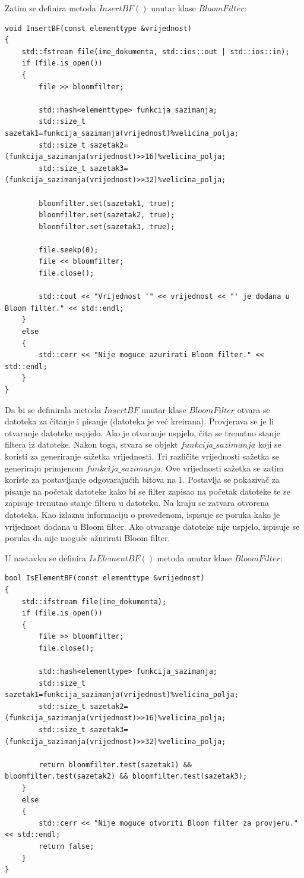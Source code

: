 \documentclass{foi}
\begin{document}
Zatim se definira metoda $InsertBF()$ unutar klase $BloomFilter$:

\begin{lstlisting}
void InsertBF(const elementtype &vrijednost)
{
    std::fstream file(ime_dokumenta, std::ios::out | std::ios::in);
    if (file.is_open())
    {
        file >> bloomfilter;

        std::hash<elementtype> funkcija_sazimanja;
        std::size_t sazetak1=funkcija_sazimanja(vrijednost)%velicina_polja;
        std::size_t sazetak2=(funkcija_sazimanja(vrijednost)>>16)%velicina_polja;
        std::size_t sazetak3=(funkcija_sazimanja(vrijednost)>>32)%velicina_polja;

        bloomfilter.set(sazetak1, true);
        bloomfilter.set(sazetak2, true);
        bloomfilter.set(sazetak3, true);

        file.seekp(0);
        file << bloomfilter;
        file.close();

        std::cout << "Vrijednost '" << vrijednost << "' je dodana u Bloom filter." << std::endl;
    }
    else
    {
        std::cerr << "Nije moguce azurirati Bloom filter." << std::endl;
    }
}
\end{lstlisting}

Da bi se definirala metoda $InsertBF$ unutar klase $BloomFilter$ otvara se datoteka za čitanje i pisanje (datoteka je već kreirana). Provjerava se je li otvaranje datoteke uspjelo. Ako je otvaranje uspjelo, čita se trenutno stanje filtera iz datoteke. Nakon toga, stvara se objekt $funkcija\_sazimanja$ koji se koristi za generiranje sažetka vrijednosti. Tri različite vrijednosti sažetka se generiraju primjenom $funkcija\_sazimanja$. Ove vrijednosti sažetka se zatim koriste za postavljanje odgovarajućih bitova na $1$. Postavlja se pokazivač za pisanje na početak datoteke kako bi se filter zapisao na početak datoteke te se zapisuje trenutno stanje filtera u datoteku. Na kraju se zatvara otvorena datoteka. Kao izlaznu informaciju o provedenom, ispisuje se poruka kako je vrijednost dodana u Bloom filter. Ako otvaranje datoteke nije uspjelo, ispisuje se poruka da nije moguće ažurirati Bloom filter.

U nastavku se definira $IsElementBF()$ metoda unutar klase $BloomFilter$:

\begin{lstlisting}
bool IsElementBF(const elementtype &vrijednost)
{
    std::ifstream file(ime_dokumenta);
    if (file.is_open())
    {
        file >> bloomfilter;
        file.close();

        std::hash<elementtype> funkcija_sazimanja;
        std::size_t sazetak1=funkcija_sazimanja(vrijednost)%velicina_polja;
        std::size_t sazetak2=(funkcija_sazimanja(vrijednost)>>16)%velicina_polja;
        std::size_t sazetak3=(funkcija_sazimanja(vrijednost)>>32)%velicina_polja;

        return bloomfilter.test(sazetak1) && bloomfilter.test(sazetak2) && bloomfilter.test(sazetak3);
    }
    else
    {
        std::cerr << "Nije moguce otvoriti Bloom filter za provjeru." << std::endl;
        return false;
    }
}
\end{lstlisting}
\end{document}
